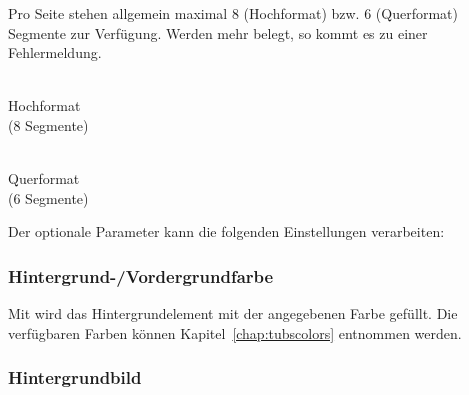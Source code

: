 \noindent\begin{minipage}{0.4\textwidth}
Pro Seite stehen allgemein maximal 8 (Hochformat) bzw. 6 (Querformat)
Segmente zur Verfügung. Werden mehr belegt, so kommt es zu einer Fehlermeldung.
\end{minipage}
\begin{minipage}{0.6\textwidth}\centering
\begin{minipage}[b]{0.4\textwidth}\centering
{}\\
Hochformat\\ (8 Segmente)
\end{minipage}
\begin{minipage}[b]{0.45\textwidth}\centering
{}\\
Querformat\\ (6 Segmente)
\end{minipage}
\end{minipage}
\vspace*{0pt}


Der optionale Parameter  kann die folgenden Einstellungen verarbeiten:

\subsubsection{Hintergrund-/Vordergrundfarbe}

\vspace{-6mm}
\begin{Declaration}
\end{Declaration}

Mit  wird das Hintergrundelement mit der angegebenen
Farbe gefüllt. Die verfügbaren Farben können Kapitel~\ref{chap:tubscolors}
entnommen werden.

\subsubsection{Hintergrundbild}


